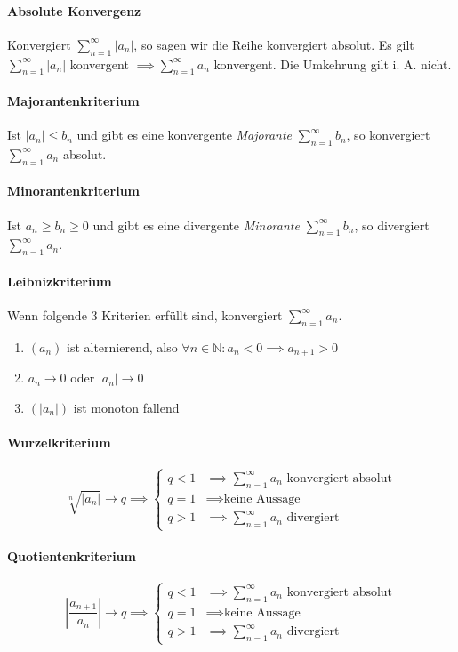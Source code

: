 \documentclass[a4paper, 9pt, DIV=24]{scrartcl}
\newcommand{\N}{\mathbb{N}}
\begin{document}
\paragraph{Absolute Konvergenz}
Konvergiert $\sum_{n=1}^\infty |a_n|$, so sagen wir die Reihe konvergiert absolut.
Es gilt $\sum_{n=1}^\infty |a_n|$ konvergent $ \implies \sum_{n=1}^\infty a_n$ konvergent.
Die Umkehrung gilt i. A. nicht.

\paragraph{Majorantenkriterium}
Ist $|a_n| \leq b_n$ und gibt es eine konvergente \emph{Majorante} $\sum_{n=1}^\infty b_n$, so konvergiert $\sum_{n=1}^\infty a_n$ absolut.

\paragraph{Minorantenkriterium}
Ist $a_n \geq b_n \geq 0$ und gibt es eine divergente \emph{Minorante} $\sum_{n=1}^\infty b_n$, so divergiert $\sum_{n=1}^\infty a_n$.

\paragraph{Leibnizkriterium}
Wenn folgende 3 Kriterien erfüllt sind, konvergiert $\sum_{n=1}^\infty a_n$.
\begin{enumerate}[label={(}\arabic*{)}]
  \item $(a_n)$ ist alternierend, also $\forall n\in\N: a_n < 0 \implies a_{n+1} > 0$
  \item $a_n \to 0$ oder $|a_n| \to 0$
  \item $(|a_n|)$ ist monoton fallend
\end{enumerate}

\paragraph{Wurzelkriterium}
\[
  \sqrt[n]{\left | a_n \right |} \to q \implies
  \begin{cases}
    q < 1 & \implies \sum_{n=1}^\infty a_n \text{ konvergiert absolut}\\
    q = 1 & \implies \text{keine Aussage}\\
    q > 1 & \implies \sum_{n=1}^\infty a_n \text{ divergiert}
  \end{cases}
\]
\paragraph{Quotientenkriterium}
\[
\left| \frac{a_{n+1}}{a_n} \right| \to q \implies
\begin{cases}
  q < 1 & \implies \sum_{n=1}^\infty a_n \text{ konvergiert absolut} \\
  q = 1 & \implies \text{keine Aussage}\\
  q > 1 & \implies \sum_{n=1}^\infty a_n \text{ divergiert}
\end{cases}
\]
\end{document}
